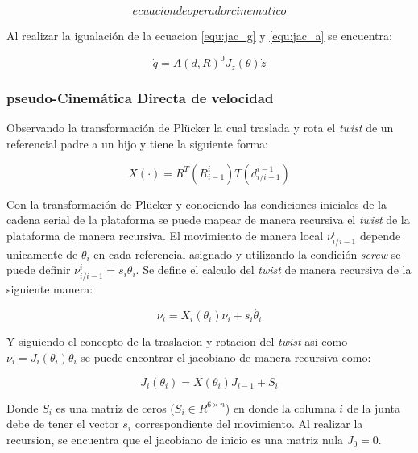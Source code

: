 \documentclass[letterpaper, 12pt]{article}
\begin{document}
\begin{equation}
ecuacion de operador cinematico
\end{equation}

Al realizar la igualación de la ecuacion \ref{equ:jac_g} y \ref{equ:jac_a} se encuentra:

\begin{equation} \label{equ:q_twist}
\dot{q} = A(d,R)^0J_z(\theta) \dot{z}
\end{equation}

\subsubsection{pseudo-Cinemática Directa de velocidad}

Observando la transformación de Plücker la cual traslada y rota el \emph{twist} de un referencial padre a un hijo y tiene la siguiente forma:

\begin{equation} \label{equ:plucker}
X(\cdot) = R^T(R_{i-1}^i)T(d_{i/i-1}^{i-1})
\end{equation}

Con la transformación de Plücker y conociendo las condiciones iniciales de la cadena serial de la plataforma se puede mapear de manera recursiva el \emph{twist} de la plataforma de manera recursiva. El movimiento de manera local $\nu_{i/i-1}^{i}$ depende unicamente de $\theta_i$ en cada referencial asignado y utilizando la condición \emph{screw} se puede definir $\nu_{i/i-1}^{i} = s_i \dot{\theta}_i$. Se define el calculo del \emph{twist} de manera recursiva de la siguiente manera:

\begin{equation} \label{equ:tiwst_rec}
\nu_i = X_i(\theta_i)\nu_i + s_i\dot{\theta_i}
\end{equation}

Y siguiendo el concepto de la traslacion y rotacion del \emph{twist} asi como $\nu_i = J_{i}(\theta_i)\dot{\theta_i}$ se puede encontrar el jacobiano de manera recursiva como:

\begin{equation}
J_i(\theta_i) = X(\theta_i) J_{i-1} + S_i
\end{equation}

Donde $S_i$ es una matriz de ceros ($S_i \in R^{6\times n}$) en donde la columna $i$ de la junta debe de tener el vector $s_i$ correspondiente del movimiento. Al realizar la recursion, se encuentra que el jacobiano de inicio es una matriz nula $J_0 = 0$.
\end{document}
